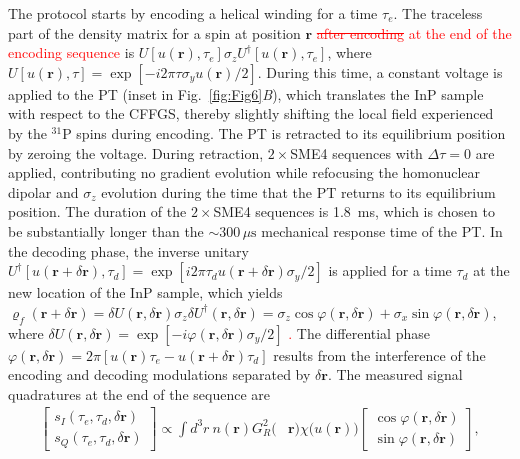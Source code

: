 \documentclass[9pt,twocolumn,twoside,lineno]{pnas-new}
\newcommand{\RB}[3][{}]{\textcolor{red}{\sout{#2} #3\ul{#1}}}
\begin{document}
The protocol starts by encoding a helical winding for a time $\tau_e$.
The traceless part of the density matrix for a spin at position $\mathbf{r}$ \RB{after encoding}{at the end of the encoding sequence} is $U\left[u(\mathbf{r}),\tau_e\right]\sigma_z U^{\dagger}\left[u(\mathbf{r}),\tau_e\right]$, where $U\left[u(\mathbf{r}),\tau\right]=\exp\left[{-i2\pi\tau\sigma_y u(\mathbf{r})/2}\right]$. During this time, a constant voltage is applied to the PT (inset in Fig.~\ref{fig:Fig6}\textit{B}), which translates the InP sample with respect to the CFFGS, thereby slightly shifting the local field experienced by the $^{31}$P spins during encoding.
The PT is retracted to its equilibrium position by zeroing the voltage.
During retraction, $2\times$SME4 sequences with $\Delta\tau=0$ are applied, contributing no gradient evolution while refocusing the homonuclear dipolar and $\sigma_z$ evolution during the time that the PT returns to its equilibrium position. The duration of the $2\times$SME4 sequences is 1.8~ms, which is chosen to be substantially longer than the $\sim 300\,\mu\text{s}$ mechanical response time of the PT.
In the decoding phase, the inverse unitary  $U^{\dagger}\left[u(\mathbf{r}+\delta\mathbf{r}),\tau_d \right]=\exp\left[i2\pi\tau_d u(\mathbf{r}+\delta\mathbf{r})\sigma_y/2\right]$ is applied for a time $\tau_d$ at the new location of the InP sample, which yields $\varrho_f(\mathbf{r}+\delta\mathbf{r}) = \delta U(\mathbf{r},\delta \mathbf{r}) \sigma_z\delta U^\dagger(\mathbf{r},\delta \mathbf{r}) =\sigma_z \cos \varphi(\mathbf{r},\delta \mathbf{r})  +\sigma_x \sin \varphi(\mathbf{r},\delta \mathbf{r})$, where $\delta U(\mathbf{r},\delta \mathbf{r}) = \exp[-i\varphi(\mathbf{r},\delta \mathbf{r})\sigma_y/2]$\RB{}{.}
The differential phase $\varphi(\mathbf{r},\delta\mathbf{r})=2\pi\left[u(\mathbf{r})\tau_e-u(\mathbf{r}+\delta\mathbf{r})\tau_d\right]$ results from the interference of the encoding and decoding modulations separated by $\delta\mathbf{r}$.
The measured signal quadratures at the end of the sequence are
\begin{align}
    \begin{bmatrix}
        s_I(\tau_e,\tau_d,\delta\mathbf{r})\\
        s_Q(\tau_e,\tau_d,\delta\mathbf{r})
    \end{bmatrix} \propto
    \int d^3r~n(\mathbf{r})G_R^2(&\mathbf{r}) \chi\big(u(\mathbf{r})\big)
    \begin{bmatrix}
        \cos\varphi(\mathbf{r},\delta\mathbf{r})\\
        \sin\varphi(\mathbf{r},\delta\mathbf{r})
    \end{bmatrix},
    \label{eq:DisplacementDiffraction}
\end{align}
\end{document}
